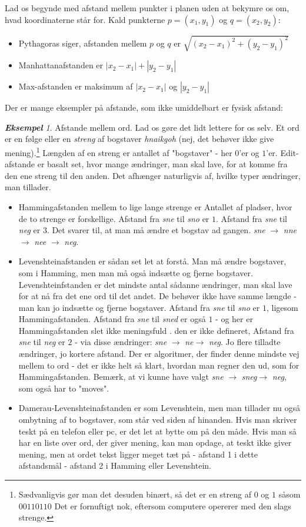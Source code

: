 \documentclass[a4paper, 12pt]{article}
\theoremstyle{remark}
\newtheorem{Eksempel}{\textbf{Eksempel}}
\begin{document}
Lad os begynde med afstand mellem punkter i planen uden at bekymre os om, hvad koordinaterne står for. Kald punkterne $p=(x_1,y_1)$ og $q=(x_2,y_2)$: 
\begin{itemize}
\item Pythagoras siger, afstanden mellem $p$ og $q$ er $\sqrt{(x_2-x_1)^2+(y_2-y_1)^2}$
\item Manhattanafstanden er $|x_2-x_1|+|y_2-y_1|$
\item Max-afstanden er maksimum af   $|x_2-x_1|$ og $|y_2-y_1|$
\end{itemize}
Der er mange eksempler på afstande, som ikke umiddelbart er fysisk afstand:
\begin{Eksempel}
Afstande mellem ord. Lad os gøre det lidt lettere for os selv. Et ord er en følge eller en \emph{streng} af bogstaver \emph{hnaikgoh} (nej, det behøver ikke give mening).\footnote{Sædvanligvis gør man det desuden binært, så det er en streng af $0$ og $1$ såsom $00110110$ Det er fornuftigt nok, eftersom computere opererer med den slags strenge.} Længden af en streng er antallet af "bogstaver" - her $0$'er og $1$'er.
Edit-afstande er basalt set, hvor mange ændringer, man skal lave, for at komme fra den ene streng til den anden. Det afhænger naturligvis af, hvilke typer ændringer, man tillader. 
\begin{itemize}
\item Hammingafstanden mellem to lige lange strenge er Antallet af pladser, hvor de to strenge er forskellige. Afstand fra \emph{sne} til \emph{sno} er $1$. Afstand fra \emph{sne} til \emph{neg} er $3$. Det svarer til, at man må ændre et bogstav ad gangen. \emph{sne} $\rightarrow$ \emph{nne} $\rightarrow$ \emph{nee} $\rightarrow$ \emph{neg}.
\item Levenshteinafstanden er sådan set let at forstå. Man må ændre bogstaver, som i Hamming, men man må også indsætte og fjerne bogstaver. Levenshteinfstanden er det mindste antal sådanne ændringer, man skal  lave for at nå fra det ene ord til det andet. De behøver ikke have samme længde - man kan jo indsætte og fjerne bogstaver. Afstand fra  \emph{sne} til \emph{sno} er $1$, ligesom Hammingafstanden. Afstand fra \emph{sne} til \emph{sned} er også $1$ - og her er Hammingafstanden slet ikke meningsfuld . den er ikke defineret, Afstand fra \emph{sne} til \emph{neg} er $2$ - via disse ændringer: \emph{sne} $\rightarrow$ \emph{ne}$\rightarrow$ \emph{neg}. Jo flere tilladte ændringer, jo kortere afstand. Der er algoritmer, der finder denne mindste vej mellem to ord - det er ikke helt så klart, hvordan man regner den ud, som for Hammingafstanden. Bemærk, at vi kunne have valgt \emph{sne} $\rightarrow$ \emph{sneg}$\rightarrow$ \emph{neg}, som også har to "moves".
\item Damerau-Levenshteinafstanden er som Levenshtein, men man tillader nu også ombytning af to bogstaver, som står ved siden af hinanden. Hvis man skriver teskt på en telefon eller pc, er det let at bytte om på den måde. Hvis man så har en liste over ord, der giver mening, kan man opdage, at teskt ikke giver mening, men at ordet tekst ligger meget tæt på - afstand 1 i dette afstandsmål - afstand 2 i Hamming eller Levenshtein.
\end{itemize}
\end{Eksempel}
\end{document}

